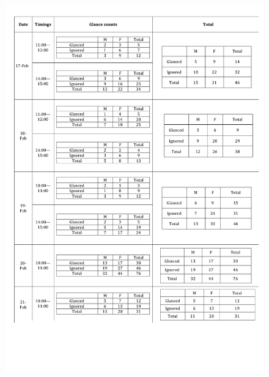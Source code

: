 \begin{appendices}
\begin{figure}[H]
 \centering 
    \includegraphics[width=\textwidth,height=0.8\textheight]{Appendices/8/mobile-interactive/mobile-interactive_glances.pdf}
     \label{app:mobile-interactive-glancecount}%
\end{figure}







\end{appendices}
